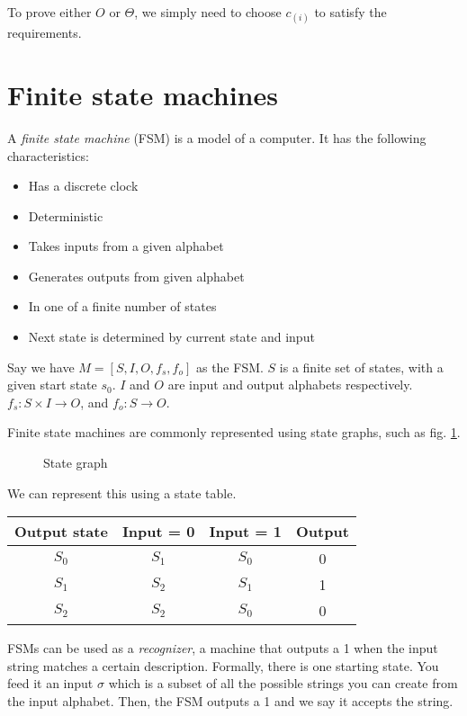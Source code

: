 \documentclass[nobib]{tufte-handout}
\begin{document}
To prove either $O$ or $\Theta$, we simply need to choose $c_{(i)}$
to satisfy the requirements. 

\section{Finite state machines}
A \emph{finite state machine} (FSM) is a model 
of a computer. It has the following characteristics: 
\begin{itemize}
    \item Has a discrete clock
    \item Deterministic
    \item Takes inputs from a given alphabet 
    \item Generates outputs from given alphabet 
    \item In one of a finite number of states 
    \item Next state is determined by current state and input 
\end{itemize}
Say we have $M = \left[S,I,O,f_s,f_o\right]$ as the FSM. 
$S$ is a finite set of states, with a given start state $s_0$. 
$I$ and $O$ are input and output alphabets respectively. 
$f_s: S\times I \rightarrow O$, and $f_o: S\rightarrow O$. 

Finite state machines are commonly represented using state graphs, 
such as fig. \ref{fig:stategraph}. 
\begin{figure}
    \caption{State graph}
    \label{fig:stategraph}
    \begin{center}
    \end{center}
\end{figure}
We can represent this using a state table.
\begin{tabular}{c | c c | c}
    \toprule 
    Output state & Input = 0 & Input = 1 & Output \\
    \hline 
    $S_0$ & $S_1$ & $S_0$ & 0 \\
    $S_1$ & $S_2$ & $S_1$ & 1 \\
    $S_2$ & $S_2$ & $S_0$ & 0 \\
    \bottomrule
\end{tabular}

FSMs can be used as a \emph{recognizer}, a machine 
that outputs a 1 when the input string matches a 
certain description. Formally, there is one starting state. 
You feed it an input $\sigma$ which is a subset of 
all the possible strings you can create from the input alphabet. 
Then, the FSM outputs a 1 and we say it accepts the string. 
\end{document}
